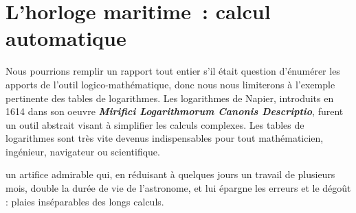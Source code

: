 \chapter{L'horloge maritime~: calcul automatique}
Nous pourrions remplir un rapport tout entier s'il était question d'énumérer les apports de l'outil logico-mathématique, donc nous nous limiterons à l'exemple pertinente des tables de logarithmes. Les logarithmes de Napier, introduits en 1614 dans son oeuvre \textbf{\emph{Mirifici Logarithmorum Canonis Descriptio}}, furent un outil abstrait visant à simplifier les calculs complexes. Les tables de logarithmes sont très vite devenus indispensables pour tout mathématicien, ingénieur, navigateur ou scientifique.

\begin{coolquote} un artifice admirable qui, en réduisant à quelques jours un travail de plusieurs mois, double la durée de vie de l'astronome, et lui épargne les erreurs et le dégoût : plaies inséparables des longs calculs.
\end{coolquote}

